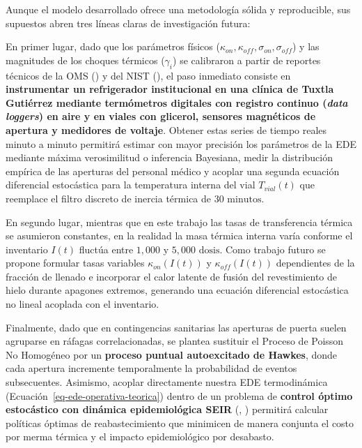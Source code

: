 \documentclass[
  spanish,
  us-letterpaper,
]{scrreprt}
\numberwithin{equation}{section}
\theoremstyle{plain}
\theoremstyle{plain}
\theoremstyle{definition}
\theoremstyle{plain}
\theoremstyle{remark}
\begin{document}
Aunque el modelo desarrollado ofrece una metodología sólida y
reproducible, sus supuestos abren tres líneas claras de investigación
futura:

En primer lugar, dado que los parámetros físicos
(\(\kappa_{on}, \kappa_{off}, \sigma_{on}, \sigma_{off}\)) y las
magnitudes de los choques térmicos (\(\gamma_i\)) se calibraron a partir
de reportes técnicos de la OMS () y del NIST
(), el paso
inmediato consiste en \textbf{instrumentar un refrigerador institucional
en una clínica de Tuxtla Gutiérrez mediante termómetros digitales con
registro continuo (\emph{data loggers}) en aire y en viales con
glicerol, sensores magnéticos de apertura y medidores de voltaje}.
Obtener estas series de tiempo reales minuto a minuto permitirá estimar
con mayor precisión los parámetros de la EDE mediante máxima
verosimilitud o inferencia Bayesiana, medir la distribución empírica de
las aperturas del personal médico y acoplar una segunda ecuación
diferencial estocástica para la temperatura interna del vial
\(T_{vial}(t)\) que reemplace el filtro discreto de inercia térmica de
\(30\text{ minutos}\).

En segundo lugar, mientras que en este trabajo las tasas de
transferencia térmica se asumieron constantes, en la realidad la masa
térmica interna varía conforme el inventario \(I(t)\) fluctúa entre
\(1,000\) y \(5,000\text{ dosis}\). Como trabajo futuro se propone
formular tasas variables \(\kappa_{on}(I(t))\) y \(\kappa_{off}(I(t))\)
dependientes de la fracción de llenado e incorporar el calor latente de
fusión del revestimiento de hielo durante apagones extremos, generando
una ecuación diferencial estocástica no lineal acoplada con el
inventario.

Finalmente, dado que en contingencias sanitarias las aperturas de puerta
suelen agruparse en ráfagas correlacionadas, se plantea sustituir el
Proceso de Poisson No Homogéneo por un \textbf{proceso puntual
autoexcitado de Hawkes}, donde cada apertura incremente temporalmente la
probabilidad de eventos subsecuentes. Asimismo, acoplar directamente
nuestra EDE termodinámica (Ecuación~\ref{eq-ede-operativa-teorica})
dentro de un problema de \textbf{control óptimo estocástico con dinámica
epidemiológica SEIR} (,
) permitirá calcular políticas
óptimas de reabastecimiento que minimicen de manera conjunta el costo
por merma térmica y el impacto epidemiológico por desabasto.
\end{document}
